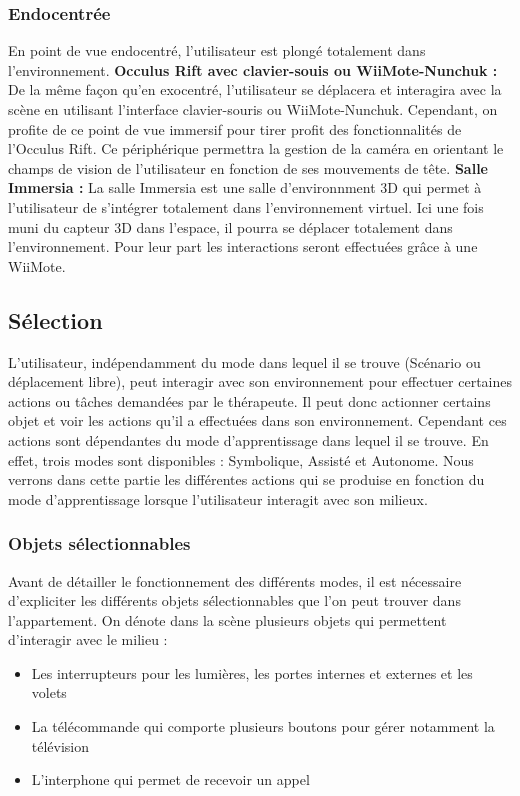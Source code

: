 \subsubsection{Endocentrée}
En point de vue endocentré, l’utilisateur est plongé totalement dans l’environnement. 
\newline
\textbf{Occulus Rift avec clavier-souis ou WiiMote-Nunchuk : }
De la même façon qu’en exocentré, l’utilisateur se déplacera et interagira avec la scène en utilisant l’interface clavier-souris ou WiiMote-Nunchuk. Cependant, on profite de ce point de vue immersif pour tirer profit des fonctionnalités de l’Occulus Rift.
Ce périphérique permettra la gestion de la caméra en orientant le champs de vision de l’utilisateur en fonction de ses mouvements de tête.
\newline
\textbf{Salle Immersia : }
La salle Immersia est une salle d’environnment 3D qui permet à l’utilisateur de s’intégrer totalement dans l’environnement virtuel. Ici une fois muni du capteur 3D dans l'espace, il pourra se déplacer totalement dans l’environnement.
Pour leur part les interactions seront effectuées grâce à une WiiMote.

\subsection{Sélection}

L'utilisateur, indépendamment du mode dans lequel il se trouve (Scénario ou déplacement libre), peut interagir avec son environnement pour effectuer certaines actions ou tâches demandées par le thérapeute. Il peut donc actionner certains objet et voir les actions qu'il a effectuées dans son environnement. Cependant ces actions sont dépendantes du mode d'apprentissage dans lequel il se trouve. En effet, trois modes sont disponibles : Symbolique, Assisté et Autonome. Nous verrons dans cette partie les différentes actions qui se produise en fonction du mode d'apprentissage lorsque l'utilisateur interagit avec son milieux. 

\subsubsection{Objets sélectionnables}

Avant de détailler le fonctionnement des différents modes, il est nécessaire d'expliciter les différents objets sélectionnables que l'on peut trouver dans l'appartement. On dénote dans la scène plusieurs objets qui permettent d'interagir avec le milieu :
\begin{itemize}
	\item Les interrupteurs pour les lumières, les portes internes et externes et les volets
	\item La télécommande qui comporte plusieurs boutons pour gérer notamment la télévision
	\item L'interphone qui permet de recevoir un appel
\end{itemize}

